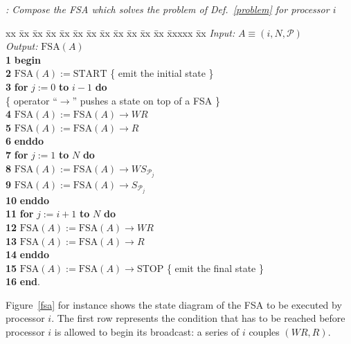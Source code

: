 \documentclass{elsart}
\newcommand{\keyw}[1]{\hbox{\bf #1}}
\begin{document}
\begin{alg}{\emph{: Compose the FSA which solves the problem of Def.~\ref{problem} for processor $i$}}
\begin{tabbing}
xx \= xx \= xx \= xx \= xx \= xx \= xx \= xx \= xx \= xx \= xx \= xx \= xxxxx \= xx \kill
         \> \> \emph{Input:\/} $A \equiv (i, N, \mathcal P)$\\
         \> \> \emph{Output:\/} $\mathrm{FSA}(A)$\\
{\bf  1} \> \> \keyw{begin}\\
{\bf  2} \> \> \> $\mathrm{FSA}(A) := \mathrm{START}$ \>\>\>\>\>\>\>\>\>\> \{ emit the initial state \} \\
{\bf  3} \> \> \> \keyw{for} $j := 0$ \keyw{to} $i-1$ \keyw{do} \\
         \> \> \> \> \{ operator ``$\rightarrow$'' pushes a state on top of a FSA \} \\
{\bf  4} \> \> \> \> $\mathrm{FSA}(A) := \mathrm{FSA}(A) \rightarrow W\!R$ \\
{\bf  5} \> \> \> \> $\mathrm{FSA}(A) := \mathrm{FSA}(A) \rightarrow R$ \\
{\bf  6} \> \> \> \keyw{enddo}\\
{\bf  7} \> \> \> \keyw{for} $j := 1$ \keyw{to} $N$ \keyw{do} \\
{\bf  8} \> \> \> \> $\mathrm{FSA}(A) := \mathrm{FSA}(A) \rightarrow W\!S_{{\mathcal P}_j}$\\
{\bf  9} \> \> \> \> $\mathrm{FSA}(A) := \mathrm{FSA}(A) \rightarrow S_{{\mathcal P}_j}$\\
{\bf 10} \> \> \> \keyw{enddo}\\
{\bf 11} \> \> \> \keyw{for} $j := i+1$ \keyw{to} $N$ \keyw{do}\\
{\bf 12} \> \> \> \> $\mathrm{FSA}(A) := \mathrm{FSA}(A) \rightarrow W\!R$\\
{\bf 13} \> \> \> \> $\mathrm{FSA}(A) := \mathrm{FSA}(A) \rightarrow R$\\
{\bf 14} \> \> \> \keyw{enddo}\\
{\bf 15} \> \> \> $\mathrm{FSA}(A) := \mathrm{FSA}(A) \rightarrow \mathrm{STOP}$ \>\>\>\>\>\>\>\>\>\> \{ emit the final  state \} \\
{\bf 16} \> \> \keyw{end}.
\end{tabbing}
\label{alg1}
\end{alg}


Figure~\ref{fsa} for instance shows the state diagram of the FSA
to be executed by processor $i$.
The first row represents the condition that has to be reached before 
processor $i$ is allowed to begin its broadcast: a series 
of $i$ couples \( (W\!R, R) \).
\end{document}
